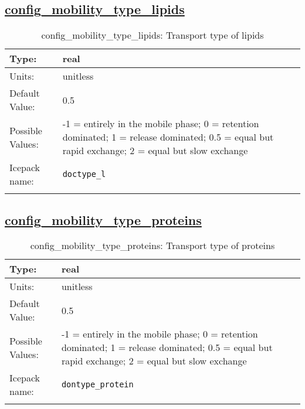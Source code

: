 \subsection[config\_mobility\_type\_lipids]{\hyperref[sec:nm_tab_biogeochemistry]{config\_mobility\_type\_lipids}}
\label{subsec:nm_sec_config_mobility_type_lipids}
\begin{center}
\begin{longtable}{| p{2.0in} || p{4.0in} |}
    \hline
    Type: & real \\
    \hline
    Units: & \si{unitless} \\
    \hline
    Default Value: & 0.5 \\
    \hline
    Possible Values: & -1 = entirely in the mobile phase; 0 = retention dominated; 1 = release dominated; 0.5 = equal but rapid exchange; 2 = equal but slow exchange \\
    \hline
    \hline
    Icepack name: & \verb+doctype_l+ \\
    \caption{config\_mobility\_type\_lipids: Transport type of lipids}
\end{longtable}
\end{center}
\subsection[config\_mobility\_type\_proteins]{\hyperref[sec:nm_tab_biogeochemistry]{config\_mobility\_type\_proteins}}
\label{subsec:nm_sec_config_mobility_type_proteins}
\begin{center}
\begin{longtable}{| p{2.0in} || p{4.0in} |}
    \hline
    Type: & real \\
    \hline
    Units: & \si{unitless} \\
    \hline
    Default Value: & 0.5 \\
    \hline
    Possible Values: & -1 = entirely in the mobile phase; 0 = retention dominated; 1 = release dominated; 0.5 = equal but rapid exchange; 2 = equal but slow exchange \\
    \hline
    \hline
    Icepack name: & \verb+dontype_protein+ \\
    \caption{config\_mobility\_type\_proteins: Transport type of proteins}
\end{longtable}
\end{center}
